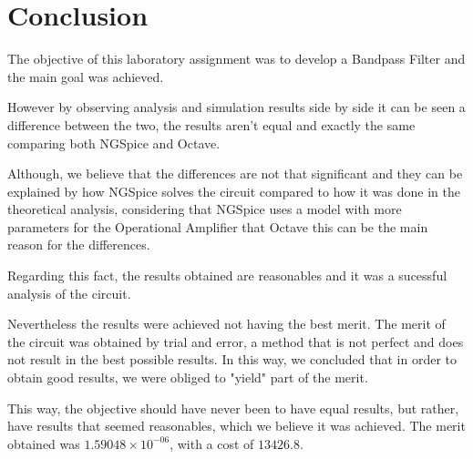 \newpage
\section{Conclusion}
\label{sec:conclusion}

\hspace{0,5cm} The objective of this laboratory assignment was to develop a Bandpass Filter and the main goal was achieved. 

\par However by observing analysis and simulation results side by side it can be seen a difference between the two, the results aren't equal and exactly the same comparing both NGSpice and Octave. 
\par Although, we believe that the differences are not that significant and they can be explained by how NGSpice solves the circuit compared to how it was done in the theoretical analysis, considering that NGSpice uses a model with more parameters for the Operational Amplifier that Octave this can be the main reason for the differences. 
\par Regarding this fact, the results obtained are reasonables and it was  a sucessful analysis of the circuit.
\par Nevertheless the results were achieved not having the best merit. The merit of the circuit was obtained by trial and error, a method that is not perfect and does not result in the best possible results. In this way, we concluded that in order to obtain good results, we were obliged to "yield" part of the merit.
\par This way, the objective should have never been to have equal results, but rather, have results that seemed reasonables, which we believe it was achieved. The merit obtained was $1.59048 \times 10^{-06}$, with a cost of $13426.8$.



